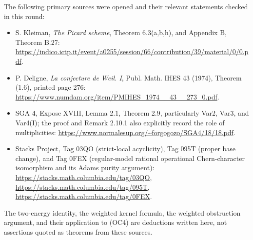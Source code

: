 The following primary sources were opened and their relevant
statements checked in this round:
\begin{itemize}
\item S. Kleiman, \emph{The Picard scheme}, Theorem 6.3(a,b,h),
and Appendix B, Theorem B.27:
\url{https://indico.ictp.it/event/a0255/session/66/contribution/39/material/0/0.pdf}.
\item P. Deligne, \emph{La conjecture de Weil. I},
Publ. Math. IHES 43 (1974), Theorem (1.6), printed page 276:
\url{https://www.numdam.org/item/PMIHES_1974__43__273_0.pdf}.
\item SGA 4, Expose XVIII, Lemma 2.1, Theorem 2.9, particularly
Var2, Var3, and Var4(I); the proof and Remark 2.10.1 also explicitly
record the role of multiplicities:
\url{https://www.normalesup.org/~forgogozo/SGA4/18/18.pdf}.
\item Stacks Project, Tag 03QO (strict-local acyclicity),
Tag 095T (proper base change), and Tag 0FEX (regular-model rational
operational Chern-character isomorphism and its Adams purity argument):
\url{https://stacks.math.columbia.edu/tag/03QO},
\url{https://stacks.math.columbia.edu/tag/095T},
\url{https://stacks.math.columbia.edu/tag/0FEX}.
\end{itemize}

The two-energy identity, the weighted kernel formula, the weighted
obstruction argument, and their application to (OC4) are deductions
written here, not assertions quoted as theorems from these sources.
